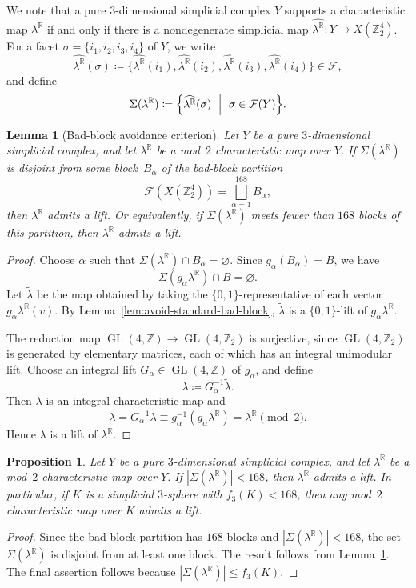 \documentclass[10pt,a4paper]{amsart}
\newcommand{\Z}{\mathbb{Z}}
\newcommand{\R}{\mathbb{R}}
\newcommand{\cF}{\mathcal{F}}
\DeclareMathOperator{\GL}{GL}
\newtheorem{proposition}[theorem]{Proposition}
\newtheorem{lemma}[theorem]{Lemma}
\begin{document}
We note that a pure $3$-dimensional simplicial complex $Y$ supports a characteristic map $\lambda^\R$ if and only if there is a nondegenerate simplicial map $\widehat{\lambda^\R} \colon Y \to X(\Z_2^4)$.
For a facet $\sigma = \{i_1, i_2, i_3, i_4\}$ of $Y$, we write
$$
    \widehat{\lambda^\R}(\sigma) \coloneq\{\widehat{\lambda^\R}(i_1),\widehat{\lambda^\R}(i_2),\widehat{\lambda^\R}(i_3),\widehat{\lambda^\R}(i_4)\}\in\cF,
$$
and define
$$
    \Sigma(\lambda^\R)\coloneq \Bigl\{\widehat{\lambda^\R}(\sigma)\ \Bigm|\ \sigma\in\cF(Y)\Bigr\}.
$$

\begin{lemma}[Bad-block avoidance criterion]\label{lem:block-avoidance}
    Let $Y$ be a pure $3$-dimensional simplicial complex, and let $\lambda^\R$ be a mod~$2$ characteristic map over $Y$.
    If $\Sigma(\lambda^\R)$ is disjoint from some block~$B_\alpha$ of the bad-block partition
    $$
        \cF(X(\Z_2^4))=\bigsqcup_{\alpha=1}^{168}B_\alpha,
    $$
    then $\lambda^\R$ admits a lift.
    Or equivalently, if $\Sigma(\lambda^\R)$ meets fewer than $168$ blocks of this partition, then $\lambda^\R$ admits a lift.
\end{lemma}
\begin{proof}
    Choose $\alpha$ such that $\Sigma(\lambda^\R)\cap B_\alpha=\varnothing$.
    Since $g_\alpha(B_\alpha)=B$, we have
    $$
        \Sigma(g_\alpha\lambda^\R)\cap B=\varnothing.
    $$
    Let $\widetilde\lambda$ be the map obtained by taking the $\{0,1\}$-representative of each vector~$g_\alpha\lambda^\R(v)$.
    By Lemma~\ref{lem:avoid-standard-bad-block}, $\widetilde\lambda$ is a $\{0,1\}$-lift of $g_\alpha\lambda^\R$.
    
    The reduction map $\GL(4,\Z) \to \GL(4,\Z_2)$ is surjective, since $\GL(4,\Z_2)$ is generated by elementary matrices, each of which has an integral unimodular lift.
    Choose an integral lift $G_\alpha\in \GL(4,\Z)$ of $g_\alpha$, and define
    $$
        \lambda\coloneq G_\alpha^{-1}\widetilde\lambda.
    $$
    Then $\lambda$ is an integral characteristic map and
    $$
        \lambda=G_\alpha^{-1}\widetilde\lambda \equiv g_\alpha^{-1}(g_\alpha\lambda^\R)=\lambda^\R \pmod 2.
    $$
    Hence $\lambda$ is a lift of $\lambda^\R$.
\end{proof}

\begin{proposition}\label{prop:168}
    Let $Y$ be a pure $3$-dimensional simplicial complex, and let $\lambda^\R$ be a mod~$2$ characteristic map over $Y$.
    If $|\Sigma(\lambda^\R)|<168$, then $\lambda^\R$ admits a lift.
    In particular, if $K$ is a simplicial $3$-sphere with $f_3(K)<168$, then any mod~$2$ characteristic map over $K$ admits a lift.
\end{proposition}
\begin{proof}
    Since the bad-block partition has $168$ blocks and $|\Sigma(\lambda^\R)|<168$, the set~$\Sigma(\lambda^\R)$ is disjoint from at least one block.
    The result follows from Lemma~\ref{lem:block-avoidance}.
    The final assertion follows because $|\Sigma(\lambda^\R)|\le f_3(K)$.
\end{proof}
\end{document}
